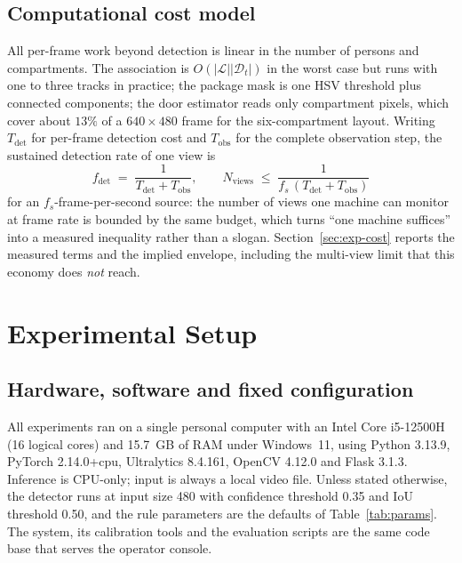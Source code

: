 \documentclass[journal,article,submit,oneauthor]{Definitions/mdpi}
\begin{document}
\subsection{Computational cost model}
\label{sec:cost}
All per-frame work beyond detection is linear in the number of persons and compartments. The
association is $O(|\mathcal{L}||\mathcal{D}_t|)$ in the worst case but runs with one to three
tracks in practice; the package mask is one HSV threshold plus connected components; the door
estimator reads only compartment pixels, which cover about $13\%$ of a $640\times480$ frame
for the six-compartment layout. Writing $T_{\mathrm{det}}$ for per-frame detection cost and
$T_{\mathrm{obs}}$ for the complete observation step, the sustained detection rate of one
view is
\begin{equation}
\label{eq:costmodel}
f_{\mathrm{det}} \;=\; \frac{1}{T_{\mathrm{det}}+T_{\mathrm{obs}}},
\qquad
N_{\mathrm{views}} \;\le\; \frac{1}{f_s\,(T_{\mathrm{det}}+T_{\mathrm{obs}})}
\end{equation}
for an $f_s$-frame-per-second source: the number of views one machine can monitor at frame
rate is bounded by the same budget, which turns ``one machine suffices'' into a measured
inequality rather than a slogan. Section~\ref{sec:exp-cost} reports the measured terms and
the implied envelope, including the multi-view limit that this economy does \emph{not}
reach.
\section{Experimental Setup}
\label{sec:setup}

\subsection{Hardware, software and fixed configuration}
\label{sec:exp-setup}
All experiments ran on a single personal computer with an Intel Core i5-12500H
(16 logical cores) and 15.7~GB of RAM under Windows~11, using Python 3.13.9,
PyTorch 2.14.0+cpu, Ultralytics 8.4.161, OpenCV 4.12.0 and Flask 3.1.3. Inference is
CPU-only; input is always a local video file. Unless stated otherwise, the detector runs at
input size 480 with confidence threshold 0.35 and IoU threshold 0.50, and the rule
parameters are the defaults of Table~\ref{tab:params}. The system, its calibration tools
and the evaluation scripts are the same code base that serves the operator console.
\end{document}
